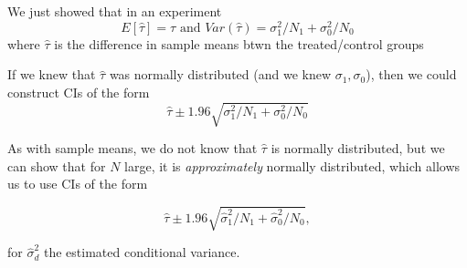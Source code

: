 \documentclass[11pt,english,handout]{beamer}
\newenvironment{wideitemize}{\itemize\addtolength{\itemsep}{10pt}}{\enditemize}
\begin{document}
\begin{frame}
	\begin{wideitemize}
		\item
		We just showed that in an experiment $$E[\hat\tau] = \tau \text{ and } Var(\hat\tau) = \sigma_1^2/N_1 + \sigma_0^2 / N_0$$ where $\hat\tau$ is the difference in sample means btwn the treated/control groups
		
		\item
		If we knew that $\hat\tau$ was normally distributed (and we knew $\sigma_1,\sigma_0$), then we could construct CIs of the form \pause
		$$ \hat\tau \pm 1.96 \sqrt{\sigma_1^2/N_1 + \sigma_0^2 / N_0} $$
		
		\pause 
		\item
		As with sample means, we do not know that $\hat\tau$ is normally distributed, but we can show that for $N$ large, it is \emph{approximately} normally distributed, which allows us to use CIs of the form
		
		 $$ \hat\tau \pm 1.96 \sqrt{\hat\sigma_1^2/N_1 + \hat\sigma_0^2 / N_0} ,$$
		 
		 for $\hat\sigma_d^2$ the estimated conditional variance.
	\end{wideitemize}
\end{frame}


\end{document}
